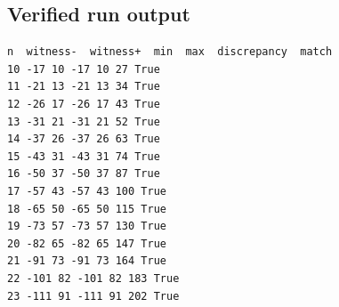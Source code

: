 \documentclass[11pt]{article}
\begin{document}
{\subsection{Verified run output}
\begin{verbatim}
n  witness-  witness+  min  max  discrepancy  match
10 -17 10 -17 10 27 True
11 -21 13 -21 13 34 True
12 -26 17 -26 17 43 True
13 -31 21 -31 21 52 True
14 -37 26 -37 26 63 True
15 -43 31 -43 31 74 True
16 -50 37 -50 37 87 True
17 -57 43 -57 43 100 True
18 -65 50 -65 50 115 True
19 -73 57 -73 57 130 True
20 -82 65 -82 65 147 True
21 -91 73 -91 73 164 True
22 -101 82 -101 82 183 True
23 -111 91 -111 91 202 True
\end{verbatim}
}
\end{document}
